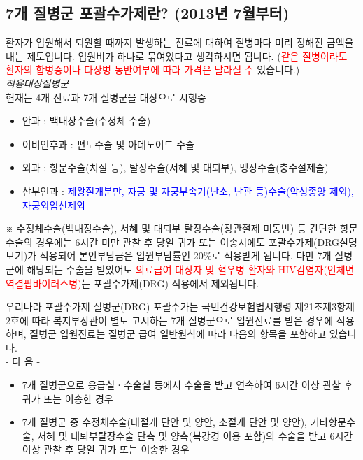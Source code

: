 \subsection{7개 질병군 포괄수가제란? (2013년 7월부터)}
환자가 입원해서 퇴원할 때까지 발생하는 진료에 대하여 질병마다 미리 정해진 금액을 내는 제도입니다. 입원비가 하나로 묶여있다고 생각하시면 됩니다. (\textcolor{red}{같은 질병이라도 환자의 합병증이나 타상병 동반여부에 따라 가격은 달라질 수} 있습니다.)\\
\prezi{\clearpage}
\emph{적용대상질병군}\\ 
현재는 4개 진료과 7개 질병군을 대상으로 시행중
\begin{itemize}\tightlist
\item 안과 : 백내장수술(수정체 수술) 
\item 이비인후과 : 편도수술 및 아데노이드 수술 
\item 외과 : 항문수술(치질 등), 탈장수술(서혜 및 대퇴부), 맹장수술(충수절제술) 
\item 산부인과 : \textcolor{blue}{제왕절개분만, 자궁 및 자궁부속기(난소, 난관 등)수술(악성종양 제외), 자궁외임신제외}
\end{itemize}
※ 수정체수술(백내장수술), 서혜 및 대퇴부 탈장수술(장관절제 미동반) 등 간단한 항문수술의 경우에는 6시간 미만 관찰 후 당일 귀가 또는 이송시에도 포괄수가제(DRG설명보기)가 적용되어 본인부담금은 입원부담률인 20\%로 적용받게 됩니다. 다만 7개 질병군에 해당되는 수술을 받았어도 \textcolor{red}{의료급여 대상자 및 혈우병 환자와 HIV감염자(인체면역결핍바이러스병)}는 포괄수가제(DRG) 적용에서 제외됩니다.
\prezi{\clearpage}
\begin{Cdoing}{우리나라 포괄수가제}
질병군(DRG) 포괄수가는 국민건강보험법시행령 제21조제3항제2호에 따라 복지부장관이 별도 고시하는 7개 질병군으로 입원진료를 받은 경우에 적용하며, 질병군 입원진료는 질병군 급여 일반원칙에 따라 다음의 항목을 포함하고 있습니다.\\
- 다 음 -
\begin{itemize}\tightlist
\item 7개 질병군으로 응급실ㆍ수술실 등에서 수술을 받고 연속하여 6시간 이상 관찰 후 귀가 또는 이송한 경우 
\item 7개 질병군 중 수정체수술(대절개 단안 및 양안, 소절개 단안 및 양안), 기타항문수술, 서혜 및 대퇴부탈장수술 단측 및 양측(복강경 이용 포함)의 수술을 받고 6시간 이상 관찰 후 당일 귀가 또는 이송한 경우
\end{itemize}
\end{Cdoing}

\clearpage
